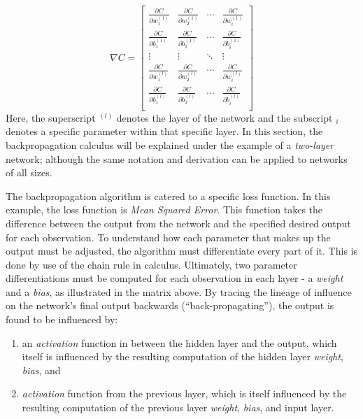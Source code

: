 \[
\nabla{C} =
\begin{bmatrix}
\frac{\partial{C}}{\partial{w_1^{(1)}}} & \frac{\partial{C}}{\partial{w_2^{(1)}}} & \cdots & 
\frac{\partial{C}}{\partial{w_i^{(1)}}} \\
\frac{\partial{C}}{\partial{b_1^{(1)}}} & \frac{\partial{C}}{\partial{b_2^{(1)}}} & \cdots & 
\frac{\partial{C}}{\partial{b_i^{(1)}}} \\
\vdots & \vdots & \ddots & \vdots \\
\frac{\partial{C}}{\partial{w_1^{(l)}}} & \frac{\partial{C}}{\partial{w_2^{(l)}}} & \cdots & 
\frac{\partial{C}}{\partial{w_i^{(l)}}} \\
\frac{\partial{C}}{\partial{b_1^{(l)}}} & \frac{\partial{C}}{\partial{b_2^{(l)}}} & \cdots & 
\frac{\partial{C}}{\partial{b_i^{(l)}}} \\
\end{bmatrix}
\] Here, the superscript \(^{(l)}\) denotes the layer of the network and
the subscript \(_i\) denotes a specific parameter within that specific
layer. In this section, the backpropagation calculus will be explained under the example of a \textit{two-layer} network; although the same notation and derivation can be applied to networks of all sizes.

The backpropagation algorithm is catered to a specific loss function. In
this example, the loss function is \emph{Mean Squared
Error}. This function takes the difference between the output from the
network and the specified desired output for each observation. To
understand how each parameter that makes up the output must be adjusted,
the algorithm must differentiate every part of it. This is done by use
of the chain rule in calculus. Ultimately, two parameter
differentiations must be computed for each observation in each layer - a
\emph{weight} and a \emph{bias}, as illustrated in the matrix above. By tracing the lineage of influence on the
network's final output backwards
(``back-propagating''), the output is found to be influenced by:

\begin{enumerate}
\tightlist
\item
  an \textit{activation} function in between the hidden layer and the output,
  which itself is influenced by the resulting computation of the hidden layer \emph{weight}, \emph{bias}, and
\item
  \textit{activation} function from the previous layer, which is itself
  influenced by the resulting computation of the previous layer
  \emph{weight}, \emph{bias}, and input layer.
\end{enumerate}

